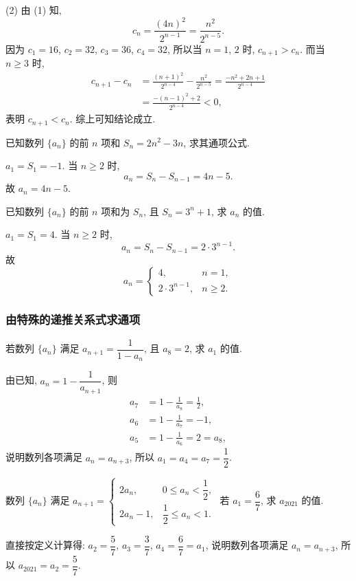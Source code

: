     (2) 由 (1) 知,
    \[c_n= \frac{(4n)^2}{2^{n-1}}= \frac{n^2}{2^{n-5}}.\]
    因为 $c_1= 16$, $c_2= 32$, $c_3= 36$, $c_4= 32$, 所以当 $n=1$, $2$ 时, $c_{n+1}> c_n$. 而当 $n\geqslant 3$ 时,
    \[\begin{aligned}
        c_{n+1}-c_n
        &= \frac{(n+1)^2}{2^{n-4}}- \frac{n^2}{2^{n-5}}
         = \frac{-n^2+2n+1}{2^{n-4}}\\
        &= \frac{-(n-1)^2+2}{2^{n-4}}< 0,
    \end{aligned}\]
    表明 $c_{n+1}< c_n$. 综上可知结论成立.
\endsolution

\lianxi
\begin{exercise}
    已知数列 $\{a_n\}$ 的前 $n$ 项和 $S_n=2n^2 -3n$, 求其通项公式.
\end{exercise}
\beginsolution
    $a_1= S_1= -1$. 当 $n\geqslant 2$ 时, 
    \[a_n= S_n-S_{n-1}= 4n-5.\]
    故 $a_n= 4n-5$.
\endsolution

\begin{exercise}
    已知数列 $\{a_n\}$ 的前 $n$ 项和为 $S_n$, 且 $S_n =3^n +1$, 求 $a_n $ 的值.
\end{exercise}
\beginsolution
    $a_1= S_1= 4$. 当 $n\geqslant 2$ 时, 
    \[a_n= S_n-S_{n-1}= 2\cdot 3^{n-1}.\]
    故 
    \[a_n= \begin{cases}
        4, & n=1,\\
        2\cdot 3^{n-1}, & n\geqslant 2.
    \end{cases}\]
\endsolution

\subsubsection{由特殊的递推关系式求通项}
\begin{example}
    若数列 $\{a_n\}$ 满足 $a_{n+1}= \dfrac1{1-a_n}$, 且 $a_8 =2$, 求 $a_1$ 的值.
\end{example}
\beginsolution
    由已知, $a_n= 1- \dfrac{1}{a_{n+1}}$, 则
    \[\begin{aligned}
        a_7&= 1- \frac{1}{a_8}= \frac12,\\
        a_6&= 1- \frac{1}{a_7}= -1,\\
        a_5&= 1- \frac{1}{a_6}= 2= a_8,
    \end{aligned}\]
    说明数列各项满足 $a_n= a_{n+3}$, 所以 $a_1=a_4=a_7= \dfrac12$.
\endsolution

\lianxi
\begin{exercise}[s]
    数列 $\{a_n\}$ 满足 $a_{n+1}=\begin{cases}
      2a_n, & 0\leqslant a_n<\dfrac12,\\
      2a_n-1, & \dfrac12\leqslant a_n< 1.\end{cases}$
    若 $a_1=\dfrac67$, 求 $a_{2021}$ 的值.
\end{exercise}
\beginsolution
    直接按定义计算得: $a_2= \dfrac57$, $a_3= \dfrac37$, $a_4= \dfrac67= a_1$, 说明数列各项满足 $a_n= a_{n+3}$, 所以 $a_{2021}= a_2= \dfrac57$.
\endsolution


